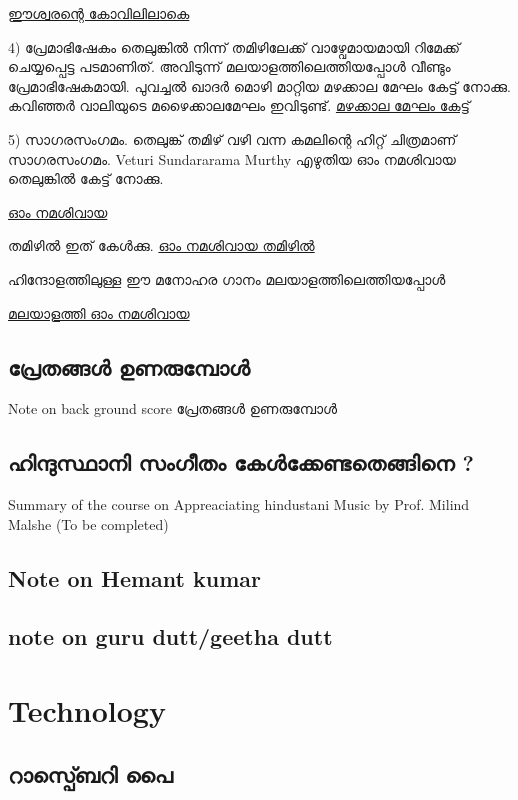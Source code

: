 \documentclass[10pt,a4paper]{report}
\begin{document}
\href{https://youtu.be/lYZkIL4iGHQ}{ഈശ്വരന്റെ കോവിലിലാകെ}

4) പ്രേമാഭിഷേകം
തെലുങ്കിൽ നിന്ന് തമിഴിലേക്ക് വാഴ്വേമായമായി റിമേക്ക് ചെയ്യപ്പെട്ട പടമാണിത്. അവിടുന്ന് മലയാളത്തിലെത്തിയപ്പോൾ വീണ്ടും പ്രേമാഭിഷേകമായി.
പുവച്ചൽ ഖാദർ മൊഴി മാറ്റിയ മഴക്കാല മേഘം കേട്ട് നോക്കു. കവിഞ്ഞർ വാലിയുടെ മഴൈക്കാലമേഘം ഇവിടുണ്ട്.
\href{https://youtu.be/6trDr3JOqcg}{മഴക്കാല മേഘം കേട്ട് }

5) സാഗരസംഗമം.
തെലുങ്ക് തമിഴ് വഴി വന്ന കമലിന്റെ ഹിറ്റ് ചിത്രമാണ് സാഗരസംഗമം.
Veturi Sundararama Murthy എഴുതിയ ഓം നമശിവായ തെലുങ്കിൽ കേട്ട് നോക്കു.

\href{https://youtu.be/m4RtS-TcbnY}{ഓം നമശിവായ }

തമിഴിൽ ഇത് കേൾക്കു.
\href{https://youtu.be/fFtTPz9h9jY}{ഓം നമശിവായ തമിഴിൽ }

ഹിന്ദോളത്തിലുള്ള ഈ മനോഹര ഗാനം മലയാളത്തിലെത്തിയപ്പോൾ

\href{https://youtu.be/wUnuMNyJ-yo}{ മലയാളത്തി ഓം നമശിവായ }
\section{പ്രേതങ്ങൾ ഉണരുമ്പോൾ } 
  Note on back ground score പ്രേതങ്ങൾ ഉണരുമ്പോൾ
\section{ഹിന്ദുസ്ഥാനി സംഗീതം കേൾക്കേണ്ടതെങ്ങിനെ ?}
   Summary of the course on Appreaciating hindustani Music by Prof. Milind Malshe (To be completed) 
\section{Note on Hemant kumar}
   
\section{note on guru dutt/geetha dutt}



\chapter{Technology}

\section{ റാസ്പ്ബെറി പൈ }
\end{document}
